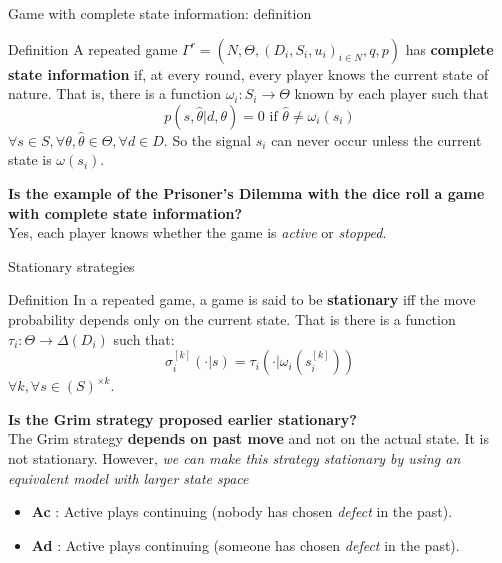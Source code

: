 \begin{frame}{Game with complete state information: definition}
    \begin{block}{Definition}
        A repeated game $\Gamma^r = (N,\Theta, (D_i,S_i,u_i)_{i\in N},q,p)$ has
        \textbf{complete state information} if, at every round, every player knows
        the current state of nature. That is, there is a function
        $\omega_i:S_i \rightarrow \Theta$ known by each player such that
        \begin{equation*}
            p(s,\hat{\theta} | d,\theta) = 0 \text{ if } \hat{\theta} \neq \omega_i(s_i)
        \end{equation*}
        $\forall s \in S, \forall \theta, \hat{\theta} \in \Theta, \forall d \in D$.
        So the signal $s_i$ can never occur unless the current state is $\omega(s_i)$.
    \end{block}

    \pause
    \textbf{{\color{green}Is the example of the Prisoner's Dilemma with the dice roll a game
    with complete state information?}} \\
    \pause
    Yes, each player knows whether the game is \textit{active} or \textit{stopped}.
\end{frame}

\begin{frame}{Stationary strategies}
    \begin{block}{Definition}
        In a repeated game, a game is said to be \textbf{stationary} iff the move probability
        depends only on the current state. That is there is a function $\tau_i : \Theta
        \rightarrow \Delta(D_i)$ such that:
        \begin{equation*}
	        \sigma_i^{[k]}(\cdot | s) = \tau_i(\cdot | \omega_i(s_i^{[k]}))
        \end{equation*}
        $\forall k, \forall s \in (S)^{\times k}$.
    \end{block}

    \pause
    \textbf{{\color{green}Is the Grim strategy proposed earlier stationary?}} \\
    \pause
    The Grim strategy \textbf{depends on past move} and not on the actual state. It
    is not stationary.
    \pause
    However, \textit{we can make this strategy stationary by using an equivalent model with larger
    state space}
    \begin{itemize}
        \item \textbf{Ac} : Active plays continuing (nobody has chosen \textit{defect} in the past).
        \item \textbf{Ad} : Active plays continuing (someone has chosen \textit{defect} in the past).
    \end{itemize}
\end{frame}


